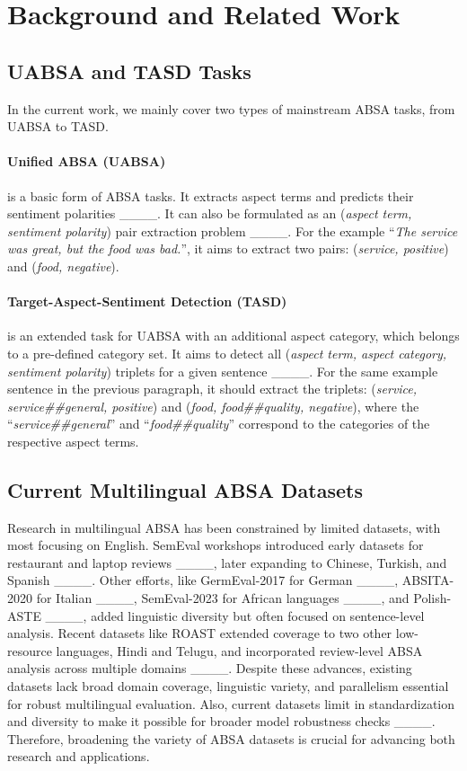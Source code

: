 \section{Background and Related Work}
\subsection{UABSA and TASD Tasks}
In the current work, we mainly cover two types of mainstream ABSA tasks, from UABSA to TASD. 

\paragraph{Unified ABSA (UABSA)} is a basic form of ABSA tasks. It extracts aspect terms and predicts their sentiment polarities ____. It can also be formulated as an (\textit{aspect term, sentiment polarity}) pair extraction problem ____. For the example ``\textit{The service was great, but the food was bad.}'', it aims to extract two pairs: (\textit{service, positive}) and (\textit{food, negative}). 

\paragraph{Target-Aspect-Sentiment Detection (TASD)} is an extended task for UABSA with an additional aspect category, which belongs to a pre-defined category set. It aims to detect all (\textit{aspect term, aspect category, sentiment polarity}) triplets for a given sentence ____. For the same example sentence in the previous paragraph, it should extract the triplets: (\textit{service, service\#\#general, positive}) and (\textit{food, food\#\#quality, negative}), where the ``\textit{service\#\#general}'' and ``\textit{food\#\#quality}'' correspond to the categories of the respective aspect terms. 



\subsection{Current Multilingual ABSA Datasets} 
Research in multilingual ABSA has been constrained by limited datasets, with most focusing on English. SemEval workshops introduced early datasets for restaurant and laptop reviews ____, later expanding to Chinese, Turkish, and Spanish ____. Other efforts, like GermEval-2017 for German ____, ABSITA-2020 for Italian ____, SemEval-2023 for African languages ____, and Polish-ASTE ____, added linguistic diversity but often focused on sentence-level analysis. Recent datasets like ROAST extended coverage to two other low-resource languages, Hindi and Telugu, and incorporated review-level ABSA analysis across multiple domains ____. Despite these advances, existing datasets lack broad domain coverage, linguistic variety, and parallelism essential for robust multilingual evaluation. Also, current datasets limit in standardization and diversity to make it possible for broader model robustness checks ____. Therefore, broadening the variety of ABSA datasets is crucial for advancing both research and applications.


